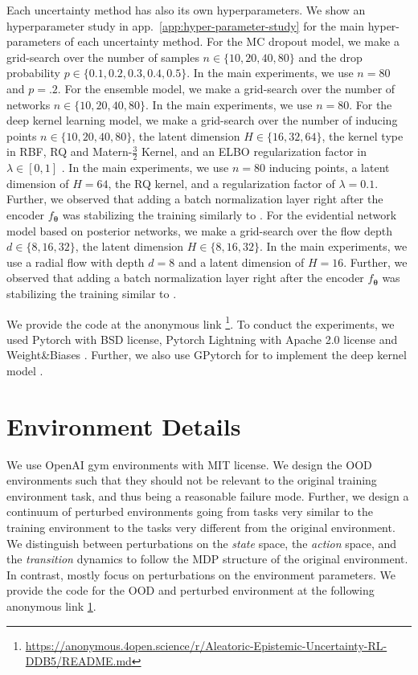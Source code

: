 Each uncertainty method has also its own hyperparameters. We show an hyperparameter study in app.~\ref{app:hyper-parameter-study} for the main hyper-parameters of each uncertainty method. For the MC dropout model, we make a grid-search over the number of samples $n \in \{10, 20, 40, 80\}$ and the drop probability $p \in \{0.1, 0.2, 0.3, 0.4, 0.5\}$. In the main experiments, we use $n=80$ and $p=.2$. For the ensemble model, we make a grid-search over the number of networks $n \in \{10, 20, 40, 80\}$. In the main experiments, we use $n=80$. For the deep kernel learning model, we make a grid-search over the number of inducing points $n \in \{10, 20, 40, 80\}$, the latent dimension $H \in \{16, 32, 64\}$, the kernel type in RBF, RQ and Matern-$\frac{3}{2}$ Kernel, and an ELBO regularization factor in $\lambda \in [0, 1]$ . In the main experiments, we use $n=80$ inducing points, a latent dimension of $H=64$, the RQ kernel, and a regularization factor of $\lambda=0.1$. Further, we observed that adding a batch normalization layer right after the encoder $f_{\bm{\theta}}$ was stabilizing the training similarly to \citet{charpentier2020}. For the evidential network model based on posterior networks, we make a grid-search over the flow depth $d \in \{8, 16, 32\}$, the latent dimension $H \in \{8, 16, 32\}$. In the main experiments, we use a radial flow with depth $d=8$ and a latent dimension of $H=16$. Further, we observed that adding a batch normalization layer right after the encoder $f_{\bm{\theta}}$ was stabilizing the training similar to \citet{charpentier2020}.

We provide the code at the anonymous link \footnote{\label{link:code}\url{https://anonymous.4open.science/r/Aleatoric-Epistemic-Uncertainty-RL-DDB5/README.md}}. To conduct the experiments, we used Pytorch \citep{pytorch} with BSD license, Pytorch Lightning \citep{pytorch-lightning} with Apache 2.0 license and Weight\&Biases \cite{wandb}. Further, we also use GPytorch for to implement the deep kernel model \cite{gpytorch}.

\section{Environment Details}
\label{app:environments-details}

We use OpenAI gym environments \citep{gym} with MIT license. We design the OOD environments such that they should not be relevant to the original training environment task, and thus being a reasonable failure mode. Further, we design a continuum of perturbed environments going from tasks very similar to the training environment to the tasks very different from the original environment. We distinguish between perturbations on the \emph{state} space, the \emph{action} space, and the \emph{transition} dynamics to follow the MDP structure of the original environment. In contrast, \citep{assessing-generalization-rl, benchmark-ood-detection-rl} mostly focus on perturbations on the environment parameters. We provide the code for the OOD and perturbed environment at the following anonymous link \cref{link:code}.

